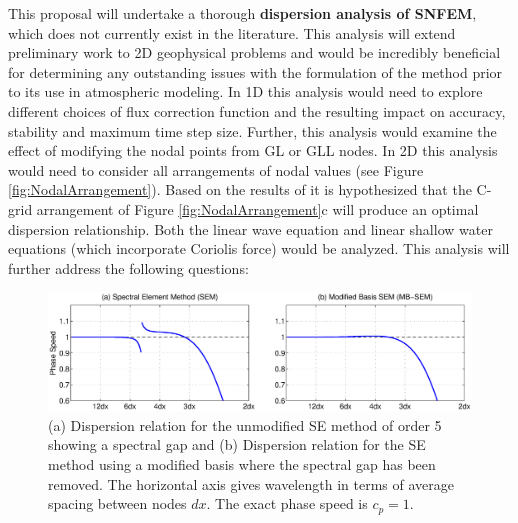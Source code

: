 \documentclass[11pt]{article}
\begin{document}
This proposal will undertake a thorough \textbf{dispersion analysis of SNFEM}, which does not currently exist in the literature.  This analysis will extend preliminary work to 2D geophysical problems and would be incredibly beneficial for determining any outstanding issues with the formulation of the method prior to its use in atmospheric modeling.  In 1D this analysis would need to explore different choices of flux correction function \cite{huynh2007flux} and the resulting impact on accuracy, stability and maximum time step size.  Further, this analysis would examine the effect of modifying the nodal points from GL or GLL nodes.  In 2D this analysis would need to consider all arrangements of nodal values (see Figure \ref{fig:NodalArrangement}).  Based on the results of \cite{randall1994geostrophic} it is hypothesized that the C-grid arrangement of Figure \ref{fig:NodalArrangement}c will produce an optimal dispersion relationship.  Both the linear wave equation and linear shallow water equations (which incorporate Coriolis force) would be analyzed.  This analysis will further address the following questions:


\begin{figure}[t]
\begin{center}
\includegraphics[width=6.5in, clip=true, trim=0cm 1.6cm 0cm 0.7cm]{ModifiedBasisMethod}
\end{center}
\caption{(a) Dispersion relation for the unmodified SE method of order 5 showing a spectral gap and (b) Dispersion relation for the SE method using a modified basis where the spectral gap has been removed.  The horizontal axis gives wavelength in terms of average spacing between nodes $dx$.  The exact phase speed is $c_p = 1$.} \label{fig:SEMDispersionGap}
\end{figure}
\end{document}
